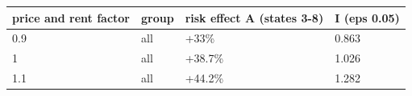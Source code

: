 \begingroup\small
\setlength{\tabcolsep}{3pt}
\renewcommand{\arraystretch}{1.04}
\begin{tabularx}{\linewidth}{XXXX}
\toprule
price and rent factor & group & risk effect A (states 3-8) & I (eps 0.05) \\
\midrule
0.9 & all & +33\% & 0.863 \\
1 & all & +38.7\% & 1.026 \\
1.1 & all & +44.2\% & 1.282 \\
\bottomrule
\end{tabularx}
\endgroup
